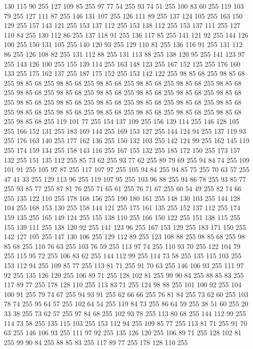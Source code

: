 130 115 90 255 127 109 85 255 97 77 54 255 93 74 51 255 100 83 60 255 119 103 79 255 127 111 87 255 146 131 107 255 126 111 89 255 137 124 105 255 163 150 129 255 157 143 121 255 153 137 112 255 153 138 112 255 153 137 111 255 127 110 84 255 130 112 86 255 137 118 91 255 136 117 85 255 141 121 92 255 144 126 100 255 150 131 105 255 140 120 93 255 129 110 81 255 136 116 91 255 131 112 86 255 126 108 82 255 131 112 88 255 131 113 88 255 138 120 95 255 141 123 97 255 143 126 100 255 155 139 114 255 163 148 123 255 167 152 125 255 176 160 133 255 175 162 137 255 187 175 152 255 153 142 122 255 98 85 68 255 98 85 68 255 98 85 68 255 98 85 68 255 98 85 68 255 98 85 68 255 98 85 68 255 98 85 68 255 98 85 68 255 98 85 68 255 98 85 68 255 98 85 68 255 98 85 68 255 98 85 68 255 98 85 68 255 98 85 68 255 98 85 68 255 98 85 68 255 98 85 68 255 98 85 68 255 98 85 68 255 98 85 68 255 98 85 68 255 98 85 68 255 98 85 68 255
98 85 68 255 98 85 68 255 119 101 77 255 154 137 109 255 156 139 114 255 146 128 105 255 166 152 131 255 183 169 144 255 169 153 127 255 144 124 94 255 137 119 93 255 176 163 140 255 177 162 136 255 150 132 103 255 142 124 99 255 162 145 119 255 174 159 134 255 158 143 116 255 167 155 132 255 185 172 150 255 173 157 132 255 151 135 112 255 85 73 62 255 93 77 62 255 89 79 69 255 94 84 74 255 109 101 91 255 105 97 87 255 117 107 97 255 105 94 84 255 94 85 75 255 70 63 57 255 47 41 33 255 129 113 96 255 119 107 95 255 103 96 88 255 94 86 78 255 93 85 77 255 93 85 77 255 87 81 76 255 71 65 61 255 76 71 67 255 60 54 49 255 82 74 66 255 135 122 110 255 178 168 156 255 190 180 161 255 148 130 103 255 144 128 104 255 168 153 130 255 158 144 121 255 175 161 135 255 152 137 112 255 174 159 135 255 165 149 124 255 155 138 110 255 166 150 122 255 151 138 115 255 155 139 111 255 138 120 92 255 141 123 96 255 167 153 129 255 183 171 150 255 142 127 105 255
147 130 106 255 129 112 89 255 123 108 88 255 98 85 68 255 98 85 68 255 110 76 63 255 103 76 59 255 113 97 74 255 110 93 70 255 122 104 79 255 115 95 72 255 106 83 62 255 144 112 99 255 114 73 58 255 135 115 103 255 153 112 94 255 109 85 77 255 113 81 71 255 91 70 63 255 146 106 93 255 111 97 92 255 135 126 120 255 106 89 71 255 128 102 81 255 99 90 84 255 88 85 83 255 117 89 77 255 178 128 110 255 113 83 71 255 124 98 88 255 101 100 92 255 104 100 91 255 79 74 67 255 94 93 91 255 62 66 66 255 76 81 84 255 73 62 60 255 103 78 74 255 95 64 57 255 102 64 54 255 119 84 73 255 86 64 59 255 38 51 60 255 20 33 38 255 73 62 57 255 97 84 68 255 102 93 78 255 113 80 68 255 144 112 99 255 114 73 58 255 135 115 103 255 153 112 94 255 109 85 77 255 113 81 71 255 91 70 63 255 146 106 93 255 111 97 92 255 135 126 120 255 106 89 71 255 128 102 81 255 99 90 84 255 88 85 83 255 117 89 77 255 178 128 110 255
